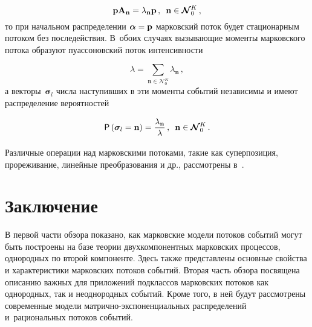{\begin{multicols}{2}
\noindent
\begin{equation*}
\mathbf{p}\mathbf{A}_{\mathbf{n}}=\lambda_{\mathbf{n}}\mathbf{p}\,,\enskip
\mathbf{n}\in \boldsymbol{\mathcal{N}}_0^K\,,
\end{equation*}
то при начальном распределении $\boldsymbol{\alpha}\hm=\mathbf{p}$ марковский 
поток будет стационарным потоком без последействия. В~обоих случаях 
вызывающие моменты марковского потока образуют пуассоновский поток 
интенсивности 

\noindent
\begin{equation*}
\lambda=\sum\limits_{\mathbf{n}\in \boldsymbol{\mathcal{N}}_0^K} 
\lambda_{\mathbf{n}}\,,
\end{equation*}
а векторы~$\boldsymbol{\sigma}_l$ числа наступивших в эти моменты событий 
независимы и имеют распределение вероятностей 

\noindent
\begin{equation*}
{\sf P}\left( \boldsymbol{\sigma}_l=\mathbf{n}\right) = 
\displaystyle\frac{\displaystyle \lambda_{\mathbf{n}}\mathstrut}{\displaystyle \lambda\mathstrut}\,,\enskip
\mathbf{n}\in \boldsymbol{\mathcal{N}}_0^K\,.
\end{equation*}
  
  Различные операции над марковскими потоками, такие как суперпозиция, 
прореживание, линейные преобразования и др., рассмотрены в~\cite{23-n}.

\vspace*{-12pt}

\section{Заключение}

\vspace*{-2pt}

  В первой части обзора показано, как марковские модели потоков событий 
могут быть построены на базе теории двухкомпонентных марковских 
процессов, однородных по второй компоненте. Здесь также представлены 
основные свойства и характеристики марковских потоков событий. Вторая 
часть обзора посвящена описанию важных для приложений подклассов 
марковских потоков как однородных, так и неоднородных событий. Кроме 
того, в ней будут рассмотрены современные модели  
мат\-рич\-но-экс\-по\-нен\-ци\-аль\-ных распределений и~рациональных потоков 
событий.

\vspace*{-12pt}

{\small\frenchspacing
 {%
 \begin{thebibliography}{99}
 

\end{thebibliography}}}
\end{multicols}}
